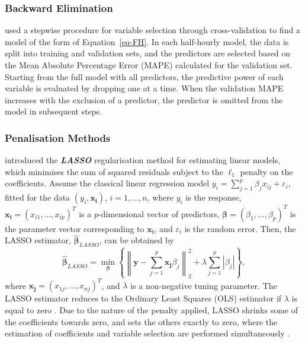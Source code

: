\documentclass[
  11pt,
  a4paper,
]{article}
\begin{document}
\subsubsection{Backward Elimination}\label{sec-backward}

\textcite{FH2012} used a stepwise procedure for variable selection
through cross-validation to find a model of the form of
Equation~\ref{eq-FH}. In each half-hourly model, the data is split into
training and validation sets, and the predictors are selected based on
the Mean Absolute Percentage Error (MAPE) calculated for the validation
set. Starting from the full model with all predictors, the predictive
power of each variable is evaluated by dropping one at a time. When the
validation MAPE increases with the exclusion of a predictor, the
predictor is omitted from the model in subsequent steps.

\subsubsection{Penalisation Methods}\label{penalisation-methods}

\textcite{Tibshirani1996} introduced the \textbf{\emph{LASSO}}
regularisation method for estimating linear models, which minimises the
sum of squared residuals subject to the \(\ell_{1}\) penalty on the
coefficients. Assume the classical linear regression model
\(y_{i} = \sum_{j=1}^{p} {\beta_{j}x_{ij}} +\varepsilon_{i}\), fitted
for the data \((y_{i}, \bm{x_{i}})\), \(i = 1, \dots, n\), where
\(y_{i}\) is the response, \(\bm{x_{i}} = (x_{i1}, \dots, x_{ip})^T\) is
a \(p\)-dimensional vector of predictors,
\(\bm{\beta} = (\beta_{1}, \dots, \beta_{p})^{T}\) is the parameter
vector corresponding to \(\bm{x_{i}}\), and \(\varepsilon_{i}\) is the
random error. Then, the LASSO estimator, \(\bm{\hat{\beta}}_{LASSO}\),
can be obtained by \[
 \bm{\hat{\beta}}_{LASSO} = \min_{\bm{\beta}}\left\{\left\lVert\bm{y} - \sum_{j=1}^{p} {\bm{x_{j}}\beta_{j}}\right\rVert_{2}^{2} + \lambda\sum_{j=1}^{p} {|\beta_{j}|}\right\},
\] where \(\bm{x_{j}} = \left (x_{1j}, \dots, x_{nj}\right )^{T}\), and
\(\lambda\) is a non-negative tuning parameter. The LASSO estimator
reduces to the Ordinary Least Squares (OLS) estimator if \(\lambda\) is
equal to zero \autocite{Konzen2016}. Due to the nature of the penalty
applied, LASSO shrinks some of the coefficients towards zero, and sets
the others exactly to zero, where the estimation of coefficients and
variable selection are performed simultaneously \autocite{Konzen2016}.
\end{document}
